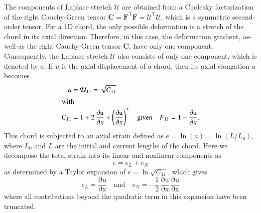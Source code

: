 The components of Laplace stretch $\boldsymbol{\mathcal{U}}$ are obtained from a Cholesky factorization of the right Cauchy-Green tensor $\mathbf{C} = \mathbf{F}^{\mathsf{T}} \mathbf{F} = \boldsymbol{\mathcal{U}}^{\mathsf{T}} \boldsymbol{\mathcal{U}}$, \cite{Srinivasa12} which is a symmetric second-order tensor. For a 1D chord, the only possible deformation is a stretch of the chord in its axial direction. Therefore, in this case, the deformation gradient, as-well-as the right Cauchy-Green tensor $\mathbf{C}$, have only one component.  Consequently, the Laplace stretch $\boldsymbol{\mathcal{U}}$ also consists of only one component, which is denoted by $a$. If $u$ is the axial displacement of a chord, then its axial elongation $a$ becomes
\begin{subequations}
    \begin{align}
    a & = {\mathcal{U}}_{11} = \sqrt{C_{11}} \\
    \intertext{with} 
    \mathrm{C_{11}} & = 1 + 2 \, \frac{\mathrm{\partial u}}{\partial x} + \left(\frac{\mathrm{\partial u}}{\partial x}\right)^2 
    \quad \text{given} \quad 
    F_{11} = 1 + \frac{\mathrm{\partial u}}{\partial x} .
    \end{align}
\end{subequations} 
This chord is subjected to an axial strain defined as $e = \ln ( a ) = \ln ( L / L_0 )$, where $L_0$ and $L$ are the initial and current lengths of the chord.  Here we decompose the total strain into its linear and nonlinear components as
\begin{equation}
e = e_{L} + e_{N}
\end{equation} 
as determined by a Taylor expansion of $e = \ln \sqrt{C_{11}}$, which gives
\begin{equation}
e_{L} = \mathrm{\frac{\partial u}{\partial x}} 
\quad \text{and} \quad
e_{N} = -\frac{1}{2} \, \mathrm{\frac{\partial u}{\partial x}}\, \mathrm{\frac{\partial u}{\partial x}} 
\end{equation}
where all contributions beyond the quadratic term in this expansion have been truncated.

